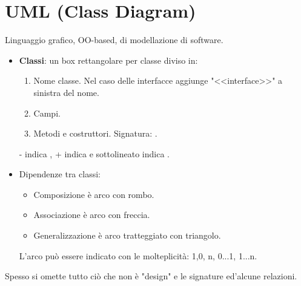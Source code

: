 \section{UML (Class Diagram)}
Linguaggio grafico, OO-based, di modellazione di software.
\begin{itemize}
	\item \textbf{Classi}: un box rettangolare per classe diviso in:
	\begin{enumerate}
		\item Nome classe. Nel caso delle interfacce aggiunge "<<interface>>" a sinistra del nome.
		\item Campi.
		\item Metodi e costruttori. Signatura: .
	\end{enumerate}
	- indica , + indica  e sottolineato indica .
	\item Dipendenze tra classi:
	\begin{itemize}
		\item Composizione è arco con rombo.
		\item Associazione è arco con freccia.
		\item Generalizzazione è arco tratteggiato con triangolo.
	\end{itemize}
	L'arco può essere indicato con le molteplicità: 1,0, n, 0...1, 1...n.
\end{itemize}

Spesso si omette tutto ciò che non è "design" e le signature ed'alcune relazioni.
